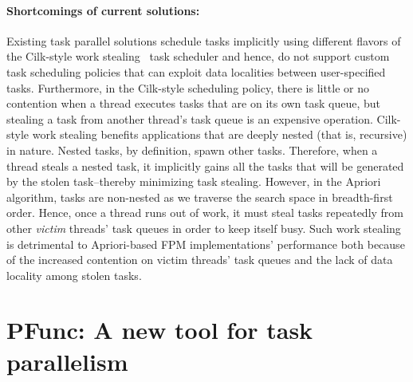 \documentclass{IOS-Book-Article}
\begin{document}
\paragraph{Shortcomings of current solutions:}
Existing task parallel solutions schedule tasks implicitly using different
flavors of the Cilk-style work stealing~\cite{Blumofe94} task scheduler and
hence, do not support custom task scheduling policies that can exploit data
localities between user-specified tasks. Furthermore, in the
Cilk-style scheduling policy, there is little or no
contention when a thread executes tasks that are on its own task queue, but stealing
a task from another thread's task queue is an expensive operation.  Cilk-style
work stealing benefits applications that are deeply nested (that is, recursive) in
nature. Nested tasks, by definition, spawn other tasks. Therefore, when a
thread steals a nested task, it implicitly gains all the tasks that will be
generated by the stolen task--thereby minimizing task stealing.  However, in
the Apriori algorithm, tasks are non-nested as we traverse the search space in
breadth-first order. Hence, once a thread runs out of work, it must steal tasks
repeatedly from other \textit{victim} threads' task queues in order to keep
itself busy.  Such work stealing is detrimental to Apriori-based FPM
implementations' performance both because of the increased contention on victim
threads' task queues and the lack of data locality among stolen tasks.

\section{PFunc: A new tool for task parallelism}
\label{sec:pfunc}
\end{document}
